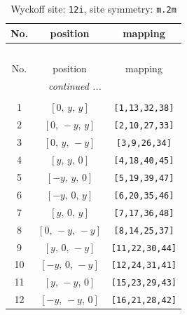 \documentclass[fleqn,8pt]{jsarticle}
\begin{document}
\begin{longtable}{ccc}
\caption{Wyckoff site: {\tt 12i}, site symmetry: {\tt m.2m}}
 \\
 \hline \hline
No. & position & mapping \\ \hline \endfirsthead

\multicolumn{2}{l}{\tablename\ \thetable{}} \\
 \hline \hline
No. & position & mapping \\ \hline \endhead

 \hline \hline
\multicolumn{2}{r}{\footnotesize\it continued ...} \\ \endfoot

 \hline \hline
\multicolumn{2}{r}{} \\ \endlastfoot

1 & $\left[ 0,\, y,\, y \right]$ & {\tt [1,13,32,38]} \\ \hline
2 & $\left[ 0,\, - y,\, y \right]$ & {\tt [2,10,27,33]} \\ \hline
3 & $\left[ 0,\, y,\, - y \right]$ & {\tt [3,9,26,34]} \\ \hline
4 & $\left[ y,\, y,\, 0 \right]$ & {\tt [4,18,40,45]} \\ \hline
5 & $\left[ - y,\, y,\, 0 \right]$ & {\tt [5,19,39,47]} \\ \hline
6 & $\left[ - y,\, 0,\, y \right]$ & {\tt [6,20,35,46]} \\ \hline
7 & $\left[ y,\, 0,\, y \right]$ & {\tt [7,17,36,48]} \\ \hline
8 & $\left[ 0,\, - y,\, - y \right]$ & {\tt [8,14,25,37]} \\ \hline
9 & $\left[ y,\, 0,\, - y \right]$ & {\tt [11,22,30,44]} \\ \hline
10 & $\left[ - y,\, 0,\, - y \right]$ & {\tt [12,24,31,41]} \\ \hline
11 & $\left[ y,\, - y,\, 0 \right]$ & {\tt [15,23,29,43]} \\ \hline
12 & $\left[ - y,\, - y,\, 0 \right]$ & {\tt [16,21,28,42]} \\
\end{longtable}
\renewcommand{\arraystretch}{1.2}
\end{document}
